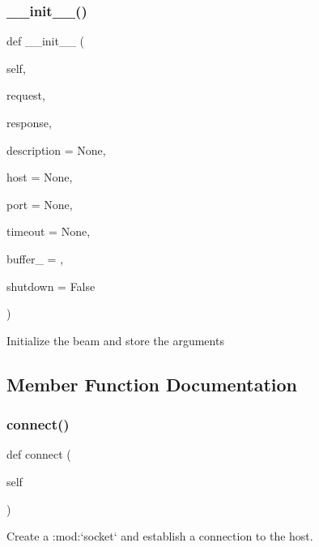 \subsubsection{\texorpdfstring{\+\_\+\+\_\+init\+\_\+\+\_\+()}{\_\_init\_\_()}}
{\footnotesize\ttfamily def \+\_\+\+\_\+init\+\_\+\+\_\+ (\begin{DoxyParamCaption}\item[{}]{self,  }\item[{}]{request,  }\item[{}]{response,  }\item[{}]{description = {\ttfamily None},  }\item[{}]{host = {\ttfamily None},  }\item[{}]{port = {\ttfamily None},  }\item[{}]{timeout = {\ttfamily None},  }\item[{}]{buffer\+\_\+ = {},  }\item[{}]{shutdown = {\ttfamily False} }\end{DoxyParamCaption})}

\begin{DoxyVerb}Initialize the beam and store the arguments\end{DoxyVerb}
 

\subsection{Member Function Documentation}
\mbox{\label{classpewpewlaz0rt4nk_1_1_beam_a5505259a51131fe89dbde6fbeab32b52}} 
\subsubsection{\texorpdfstring{connect()}{connect()}}
{\footnotesize\ttfamily def connect (\begin{DoxyParamCaption}\item[{}]{self }\end{DoxyParamCaption})}

\begin{DoxyVerb}Create a :mod:`socket` and establish a connection to the host.
\end{DoxyVerb}
 \mbox{\label{classpewpewlaz0rt4nk_1_1_beam_a06b2ff79fbf32e40f6f846b887ec7245}} 
